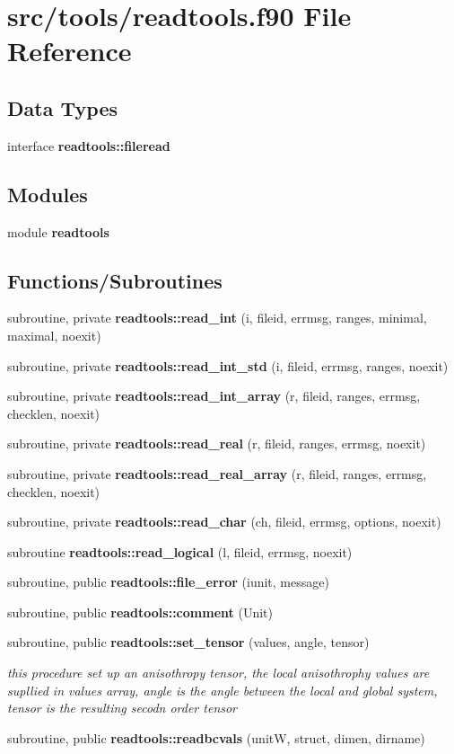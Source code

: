 \section{src/tools/readtools.f90 File Reference}
\label{readtools_8f90}
\subsection*{Data Types}
\begin{DoxyCompactItemize}
\item 
interface {\bf readtools\+::fileread}
\end{DoxyCompactItemize}
\subsection*{Modules}
\begin{DoxyCompactItemize}
\item 
module {\bf readtools}
\end{DoxyCompactItemize}
\subsection*{Functions/\+Subroutines}
\begin{DoxyCompactItemize}
\item 
subroutine, private {\bf readtools\+::read\+\_\+int} (i, fileid, errmsg, ranges, minimal, maximal, noexit)
\item 
subroutine, private {\bf readtools\+::read\+\_\+int\+\_\+std} (i, fileid, errmsg, ranges, noexit)
\item 
subroutine, private {\bf readtools\+::read\+\_\+int\+\_\+array} (r, fileid, ranges, errmsg, checklen, noexit)
\item 
subroutine, private {\bf readtools\+::read\+\_\+real} (r, fileid, ranges, errmsg, noexit)
\item 
subroutine, private {\bf readtools\+::read\+\_\+real\+\_\+array} (r, fileid, ranges, errmsg, checklen, noexit)
\item 
subroutine, private {\bf readtools\+::read\+\_\+char} (ch, fileid, errmsg, options, noexit)
\item 
subroutine {\bf readtools\+::read\+\_\+logical} (l, fileid, errmsg, noexit)
\item 
subroutine, public {\bf readtools\+::file\+\_\+error} (iunit, message)
\item 
subroutine, public {\bf readtools\+::comment} (Unit)
\item 
subroutine, public {\bf readtools\+::set\+\_\+tensor} (values, angle, tensor)
\begin{DoxyCompactList}\small\item\em this procedure set up an anisothropy tensor, the local anisothrophy values are supllied in values array, angle is the angle between the local and global system, tensor is the resulting secodn order tensor \end{DoxyCompactList}\item 
subroutine, public {\bf readtools\+::readbcvals} (unitW, struct, dimen, dirname)
\end{DoxyCompactItemize}
